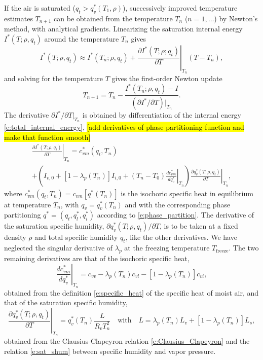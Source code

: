 \documentclass{report}
\begin{document}
If the air is saturated ($q_t > q_v^*(T_1, \rho)$), successively improved temperature estimates $T_{n+1}$ can be obtained from the temperature $T_n$ ($n=1,\dots$) by Newton's method, with analytical gradients. Linearizing the saturation internal energy $I^*(T; \rho, q_t)$ around the temperature $T_n$ gives
\begin{equation}
    I^*(T; \rho, q_t) \approx I^*(T_n; \rho, q_t) + \left.\frac{\partial I^*(T; \rho; q_t)}{\partial T}\right|_{T_n} (T - T_n),
\end{equation}
and solving for the temperature $T$ gives the first-order Newton update
\begin{equation}
    T_{n+1} = T_{n} - \frac{I^*(T_{n}; \rho, q_t) - I}{(\partial I^*/\partial T)|_{T_{n}}}.
\end{equation}
The derivative $\partial I^*/\partial T|_{T_n}$ is obtained by differentiation of the internal energy \eqref{e:total_internal_energy}, \hl{[add derivatives of phase partitioning function and make that function smooth]}
\begin{multline}
     \left.\frac{\partial I^*(T; \rho, q_t)}{\partial T}\right|_{T_n} 
     = c_{vm}^*(q_t, T_n) \\
     +  \left( I_{v,0} + [1-\lambda_p(T_n)]I_{i,0} + (T_n - T_0) \left. \frac{dc_{vm}^*}{dq_v^*}\right|_{T_n} \right) \left. \frac{\partial q_v^*(T; \rho, q_t)}{\partial T}\right|_{T_n},
\end{multline}
where $c_{vm}^*(q_t, T_n) = c_{vm}[q^*(T_n)]$ is the isochoric specific heat in equilibrium at temperature $T_n$, with $q_v = q_v^*(T_n)$ and with the corresponding phase partitioning $q^* = (q_t, q_l^*, q_i^*)$ according to \eqref{e:phase_partition}. The derivative of the saturation specific humidity, $\partial q_v^*(T;\rho, q_t)/\partial T$, is to be taken at a fixed density $\rho$ and total specific humidity $q_t$, like the other derivatives. We have neglected the singular derivative of $\lambda_p$ at the freezing temperature $T_{\mathrm{freeze}}$. The two remaining derivatives are that of the isochoric specific heat,
\begin{equation}
    \left. \frac{dc_{vm}^*}{dq_v^*}\right|_{T_n} = c_{vv} - \lambda_p(T_n) c_{vl} - [1-\lambda_p(T_n)]c_{vi},
\end{equation}
obtained from the definition \eqref{e:specific_heat} of the specific heat of moist air, and that of the saturation specific humidity,
\begin{equation}
    \left. \frac{\partial q_v^*(T; \rho, q_t)}{\partial T}\right|_{T_n} = q_v^*(T_n) \frac{L}{R_v T_n^2} \quad \text{with} \quad L = \lambda_p(T_n) L_v + [1-\lambda_p(T_n)] L_s,
\end{equation}
obtained from the Clausius-Clapeyron relation \eqref{e:Clausius_Clapeyron} and the relation \eqref{e:sat_shum} between specific humidity and vapor pressure. 
\end{document}

